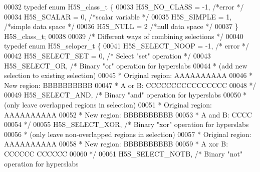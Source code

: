 \begin{DoxyCode}
00032 \textcolor{keyword}{typedef} \textcolor{keyword}{enum} H5S\_class\_t \{
00033     H5S\_NO\_CLASS         = -1,  \textcolor{comment}{/*error                                      */}
00034     H5S\_SCALAR           = 0,   \textcolor{comment}{/*scalar variable                            */}
00035     H5S\_SIMPLE           = 1,   \textcolor{comment}{/*simple data space                          */}
00036     H5S\_NULL             = 2    \textcolor{comment}{/*null data space                            */}
00037 \} H5S\_class\_t;
00038 
00039 \textcolor{comment}{/* Different ways of combining selections */}
00040 \textcolor{keyword}{typedef} \textcolor{keyword}{enum} H5S\_seloper\_t \{
00041     H5S\_SELECT\_NOOP      = -1,  \textcolor{comment}{/* error                                     */}
00042     H5S\_SELECT\_SET       = 0,   \textcolor{comment}{/* Select "set" operation            */}
00043     H5S\_SELECT\_OR,              \textcolor{comment}{/* Binary "or" operation for hyperslabs}
00044 \textcolor{comment}{                                 * (add new selection to existing selection)}
00045 \textcolor{comment}{                                 * Original region:  AAAAAAAAAA}
00046 \textcolor{comment}{                                 * New region:             BBBBBBBBBB}
00047 \textcolor{comment}{                                 * A or B:           CCCCCCCCCCCCCCCC}
00048 \textcolor{comment}{                                 */}
00049     H5S\_SELECT\_AND,             \textcolor{comment}{/* Binary "and" operation for hyperslabs}
00050 \textcolor{comment}{                                 * (only leave overlapped regions in selection)}
00051 \textcolor{comment}{                                 * Original region:  AAAAAAAAAA}
00052 \textcolor{comment}{                                 * New region:             BBBBBBBBBB}
00053 \textcolor{comment}{                                 * A and B:                CCCC}
00054 \textcolor{comment}{                                 */}
00055     H5S\_SELECT\_XOR,             \textcolor{comment}{/* Binary "xor" operation for hyperslabs}
00056 \textcolor{comment}{                                 * (only leave non-overlapped regions in selection)}
00057 \textcolor{comment}{                                 * Original region:  AAAAAAAAAA}
00058 \textcolor{comment}{                                 * New region:             BBBBBBBBBB}
00059 \textcolor{comment}{                                 * A xor B:          CCCCCC    CCCCCC}
00060 \textcolor{comment}{                                 */}
00061     H5S\_SELECT\_NOTB,            \textcolor{comment}{/* Binary "not" operation for hyperslabs}

\end{DoxyCode}
